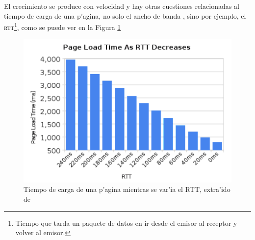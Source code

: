 \documentclass[a4paper,11pt,twocolumn]{article}
\begin{document}
El crecimiento se produce con velocidad \cite{averageWebPage} y hay otras cuestiones relacionadas al tiempo de carga de una p'agina, no solo el ancho de banda \cite{moreBand}, sino por ejemplo, el \textsc{rtt}\footnote{Tiempo que tarda un paquete de datos en ir desde el emisor al receptor y volver al emisor.}, como se puede ver en la Figura \ref{rttBelsche}

\begin{figure}[h!]
  	\centering
	\includegraphics[scale=0.5]{belsche}
	\caption{\small Tiempo de carga de una p'agina mientras se var'ia el RTT, extra'ido de \cite{moreBand}}
	\label{rttBelsche}
\end{figure}
\end{document}
